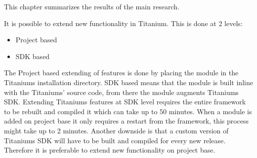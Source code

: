 



This chapter summarizes the results of the main research.



It is possible to extend new functionality in Titanium. This is done at 2 levels:
\begin{itemize}
	\item Project based
	\item SDK based
\end{itemize}
The Project based extending of features is done by placing the module in the Titaniums installation directory. SDK based means that the module is built inline with the Titaniums' source code, from there the module augments Titaniums SDK.  Extending Titaniums features at SDK level requires the entire framework to be rebuilt and compiled it which can take up to 50 minutes. When a module is added on project base it only requires a restart from the framework, this process might take up to 2 minutes. Another downside is that a custom version of Titaniums SDK will have to be built and compiled for every new release. Therefore it is preferable to extend new functionality on project base.



